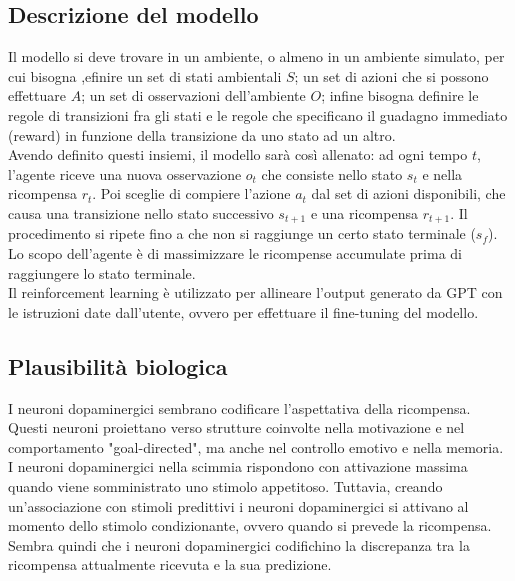 \subsection{Descrizione del modello}

Il modello si deve trovare in un ambiente, o almeno in un ambiente simulato, per
cui bisogna ,efinire un set di stati ambientali $S$; un set di azioni che si
possono effettuare $A$; un set di osservazioni dell'ambiente $O$; infine bisogna
definire le regole di transizioni fra gli stati e le regole che specificano il
guadagno immediato (reward) in funzione della transizione da uno stato ad un
altro.\\
Avendo definito questi insiemi, il modello sarà così allenato:
ad ogni tempo $t$, l'agente riceve una nuova osservazione $o_t$ che consiste
nello stato $s_t$ e nella ricompensa $r_t$. Poi sceglie di compiere l'azione
$a_t$ dal set di azioni disponibili, che causa una transizione nello stato
successivo $s_{t+1}$ e una ricompensa $r_{t+1}$. Il procedimento si ripete fino
a che non si raggiunge un certo stato terminale ($s_f$).\\
Lo scopo dell'agente è di massimizzare le ricompense accumulate prima di
raggiungere lo stato terminale.\\
Il reinforcement learning è utilizzato per allineare l'output generato da GPT
con le istruzioni date dall'utente, ovvero per effettuare il fine-tuning del
modello.

\subsection{Plausibilità biologica}

I neuroni dopaminergici sembrano codificare l'aspettativa della ricompensa.
Questi neuroni proiettano verso strutture coinvolte nella motivazione e nel
comportamento "goal-directed", ma anche nel controllo emotivo e nella memoria.\\
I neuroni dopaminergici nella scimmia rispondono con attivazione massima quando
viene somministrato uno stimolo appetitoso. Tuttavia, creando un'associazione
con stimoli predittivi i neuroni dopaminergici si attivano al momento dello
stimolo condizionante, ovvero quando si prevede la ricompensa.
Sembra quindi che i neuroni dopaminergici codifichino la discrepanza tra la
ricompensa attualmente ricevuta e la sua predizione.
